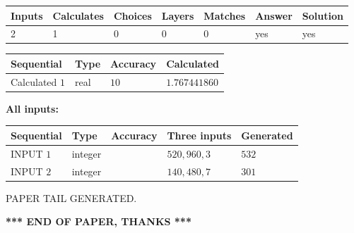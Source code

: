 \documentclass{ctexart}
\begin{document}
   
   
   
\noindent\begin{tabular}{|l|l|l|l|l|l|l|}
 \hline
Inputs & Calculates & Choices & Layers & Matches & Answer & Solution \\ \hline
 2  & 
 1  & 
 0
  & 
 0  & 
 0  & 
  yes & 
  yes 
  \\ \hline
 \end{tabular}
   
   
   
   
\noindent{}
   
   
  
  
\noindent\begin{tabular}{|l|l|l|l|}
\hline
 Sequential & Type & Accuracy & Calculated \\ 
\hline
 
 
  Calculated $  1 $ & real & $  10  $ & 
 $ 1.767441860 $ 
 \\  \hline  
 \end{tabular}
   
   
   
   
\noindent\vspace{0.1in}\hspace{-0.08in} {\textbf{\Large{All inputs: }}}
   
   
  
  
\noindent\begin{tabular}{|l|l|l|l|l|}
\hline
 Sequential & Type & Accuracy & Three inputs & Generated \\ 
\hline
 
 
  INPUT $  1 $ & integer &  & $
 520
 , 
 960
 , 
 3
 $ & $ 532 $ 
 \\  \hline  
 
 
  INPUT $  2 $ & integer &  & $
 140
 , 
 480
 , 
 7
 $ & $ 301 $ 
 \\  \hline  
 \end{tabular}
   
   
   
   
   
   
 \vspace{0.2in}
 
   
   
\vspace{2.0in} PAPER TAIL GENERATED.
   
   
   
   
\vspace{1.0in} 
{\textbf{\large{ *** END OF PAPER, THANKS *** }}} 
   
\end{document}
